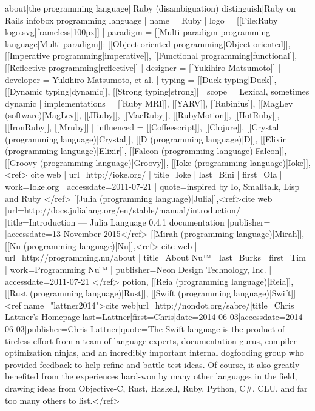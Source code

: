 {{about|the programming language||Ruby (disambiguation)}}
{{distinguish|Ruby on Rails}}
{{infobox programming language
 | name                   = Ruby
 | logo                   = [[File:Ruby logo.svg|frameless|100px]]
 | paradigm               = [[Multi-paradigm programming language|Multi-paradigm]]: [[Object-oriented programming|Object-oriented]], [[Imperative programming|imperative]], [[Functional programming|functional]], [[Reflective programming|reflective]]
 | designer               = [[Yukihiro Matsumoto]]
 | developer              = Yukihiro Matsumoto, et al.
 | typing                 = [[Duck typing|Duck]], [[Dynamic typing|dynamic]], [[Strong typing|strong]]
 | scope                  = Lexical, sometimes dynamic
 | implementations        = [[Ruby MRI]], [[YARV]], [[Rubinius]], [[MagLev (software)|MagLev]], [[JRuby]], [[MacRuby]], [[RubyMotion]], [[HotRuby]], [[IronRuby]], [[Mruby]]
| influenced              = [[Coffeescript]], [[Clojure]], [[Crystal (programming language)|Crystal]], [[D (programming language)|D]], [[Elixir (programming language)|Elixir]], [[Falcon (programming language)|Falcon]], [[Groovy (programming language)|Groovy]], [[Ioke (programming language)|Ioke]],<ref>
{{cite web
   | url=http://ioke.org/
   | title=Ioke
   | last=Bini
   | first=Ola
   | work=Ioke.org
   | accessdate=2011-07-21
   | quote=inspired by Io, Smalltalk, Lisp and Ruby}}
</ref> [[Julia (programming language)|Julia]],<ref>{{cite web |url=http://docs.julialang.org/en/stable/manual/introduction/ |title=Introduction — Julia Language 0.4.1 documentation |publisher= |accessdate=13 November 2015}}</ref> [[Mirah (programming language)|Mirah]], [[Nu (programming language)|Nu]],<ref>
{{cite web
   | url=http://programming.nu/about
   | title=About Nu™
   | last=Burks
   | first=Tim
   | work=Programming Nu™
   | publisher=Neon Design Technology, Inc.
   | accessdate=2011-07-21}}
</ref> potion, [[Reia (programming language)|Reia]], [[Rust (programming language)|Rust]], [[Swift (programming language)|Swift]]<ref name="lattner2014">{{cite web|url=http://nondot.org/sabre/|title=Chris Lattner's Homepage|last=Lattner|first=Chris|date=2014-06-03|accessdate=2014-06-03|publisher=Chris Lattner|quote=The Swift language is the product of tireless effort from a team of language experts, documentation gurus, compiler optimization ninjas, and an incredibly important internal dogfooding group who provided feedback to help refine and battle-test ideas. Of course, it also greatly benefited from the experiences hard-won by many other languages in the field, drawing ideas from Objective-C, Rust, Haskell, Ruby, Python, C#, CLU, and far too many others to list.}}</ref>
}}
